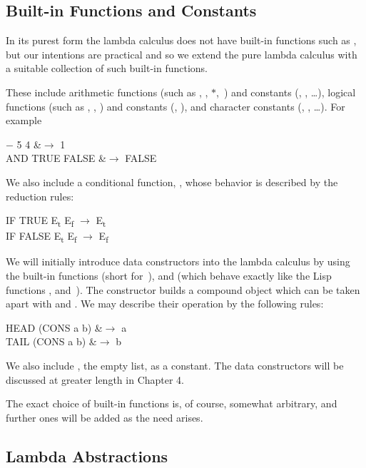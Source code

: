 \subsection{Built-in Functions and Constants}
In its purest form the lambda calculus does not have built-in functions such as
\ml{+}, but our intentions are practical and so we extend the pure lambda calculus
with a suitable collection of such built-in functions.

These include arithmetic functions (such as \ml{+}, \ml{--}, $*$, \ml{/}\,) and constants (, ,
\ldots), logical functions (such as , , ) and constants (,
), and character constants (, , \ldots). For example
\begin{mlalign}
	$-$ 5 4 &$\to$ 1\\
AND TRUE FALSE &$\to$ FALSE
\end{mlalign}
We also include a conditional function, , whose behavior is described by the
reduction rules:
\begin{mlcoded}
IF TRUE E\textsubscript{t} E\textsubscript{f} $\to$ E\textsubscript{t}\\
IF FALSE E\textsubscript{t} E\textsubscript{f} $\to$ E\textsubscript{f}
\end{mlcoded}

We will initially introduce data constructors into the lambda calculus by
using the built-in functions  (short for \,),  and 
(which behave exactly like the Lisp functions ,  and \,). The
constructor  builds a compound object which can be taken apart with
 and . We may describe their operation by the following rules:
\begin{mlalign}
HEAD (CONS a b) &$\to$ a\\
TAIL (CONS a b) &$\to$ b
\end{mlalign}
We also include , the empty list, as a constant. The data constructors will
be discussed at greater length in Chapter 4.

The exact choice of built-in functions is, of course, somewhat arbitrary, and
further ones will be added as the need arises.

\subsection{Lambda Abstractions}


